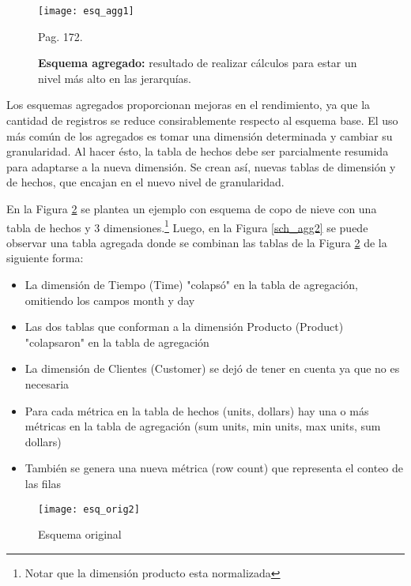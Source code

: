 \documentclass[a4paper,11pt]{article}
\begin{document}
    \begin{figure}
      \begin{center}
        \texttt{[image: esq\_agg1]}
        \caption{\textbf{Esquema agregado:} resultado de realizar cálculos para estar un nivel más alto en las jerarquías.} \cite{nagabhushana} Pag. 172.
        \label{sch_agg1}
      \end{center}
    \end{figure}
    
    
    Los esquemas agregados proporcionan mejoras en el rendimiento, ya que la cantidad de registros se reduce consirablemente respecto al esquema base. El
    uso más común de los agregados es tomar una dimensión determinada y cambiar su granularidad. Al hacer ésto, la tabla de hechos debe ser parcialmente
    resumida para adaptarse a la nueva dimensión. Se crean así, nuevas tablas de dimensión y de hechos, que encajan en el nuevo nivel de granularidad.\par
    
    En la Figura \ref{sch_orig2} se plantea un ejemplo con esquema de copo de nieve con una tabla de hechos y 3 dimensiones.\footnote{Notar que la
    dimensión producto esta normalizada} Luego, en la Figura \ref{sch_agg2} se puede observar una tabla agregada donde se combinan las tablas de la
    Figura \ref{sch_orig2} de la siguiente forma:\par
    
    \begin{itemize}
      \item La dimensión de Tiempo (Time) "colapsó" en la tabla de agregación, omitiendo los campos month y day
      \item Las dos tablas que conforman a la dimensión Producto (Product) "colapsaron" en la tabla de agregación
      \item La dimensión de Clientes (Customer) se dejó de tener en cuenta ya que no es necesaria
      \item Para cada métrica en la tabla de hechos (units, dollars) hay una o más métricas en la tabla de agregación (sum units, min units, max units,
      sum dollars)
      \item También se genera una nueva métrica (row count) que representa el conteo de las filas
    \end{itemize}
    
    \begin{figure}
      \begin{center}
        \texttt{[image: esq\_orig2]}
        \caption{Esquema original} \cite{agg_tables}
        \label{sch_orig2}
      \end{center}
    \end{figure}
    
\end{document}
